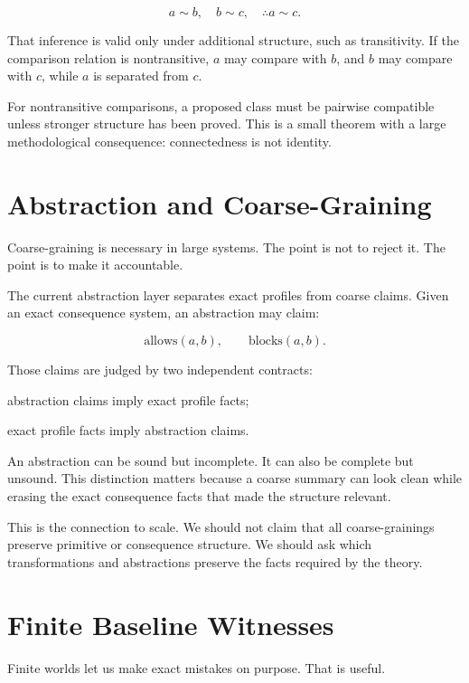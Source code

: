 \documentclass[11pt]{article}
\begin{document}
\[
a \sim b,\quad b \sim c,\quad \therefore a \sim c.
\]

That inference is valid only under additional structure, such as transitivity.
If the comparison relation is nontransitive, \(a\) may compare with \(b\), and
\(b\) may compare with \(c\), while \(a\) is separated from \(c\).

For nontransitive comparisons, a proposed class must be pairwise compatible
unless stronger structure has been proved. This is a small theorem with a large
methodological consequence: connectedness is not identity.

\section{Abstraction and Coarse-Graining}

Coarse-graining is necessary in large systems. The point is not to reject it.
The point is to make it accountable.

The current abstraction layer separates exact profiles from coarse claims.
Given an exact consequence system, an abstraction may claim:

\[
\mathrm{allows}(a,b), \qquad \mathrm{blocks}(a,b).
\]

Those claims are judged by two independent contracts:

\begin{description}[leftmargin=*]
  \item[soundness] abstraction claims imply exact profile facts;
  \item[completeness] exact profile facts imply abstraction claims.
\end{description}

An abstraction can be sound but incomplete. It can also be complete but
unsound. This distinction matters because a coarse summary can look clean while
erasing the exact consequence facts that made the structure relevant.

This is the connection to scale. We should not claim that all coarse-grainings
preserve primitive or consequence structure. We should ask which
transformations and abstractions preserve the facts required by the theory.

\section{Finite Baseline Witnesses}

Finite worlds let us make exact mistakes on purpose. That is useful.
\end{document}
